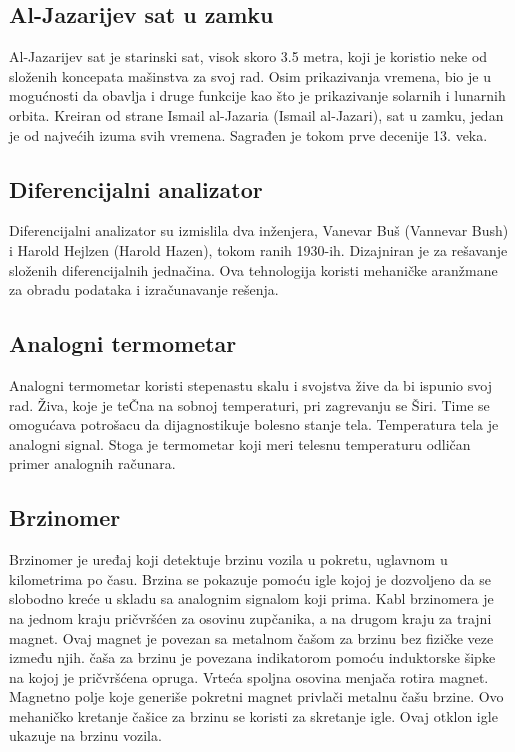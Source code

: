 \documentclass[a4paper]{article}
\begin{document}
{\subsection{Al-Jazarijev sat u zamku}
\label{subsec:podnaslov2}

Al-Jazarijev sat je starinski sat, visok skoro 3.5 metra, koji je koristio neke od složenih koncepata mašinstva za svoj rad. Osim prikazivanja vremena, bio je u mogućnosti da obavlja i druge funkcije kao što je prikazivanje solarnih i lunarnih orbita. Kreiran od strane Ismail al-Jazaria (Ismail al-Jazari), sat u zamku, jedan je od najvećih izuma svih vremena. Sagrađen je tokom prve decenije 13. veka. 

\subsection{Diferencijalni analizator}
\label{subsec:podnaslov3}

 Diferencijalni analizator su izmislila dva inženjera, Vanevar Buš (Vannevar Bush) i Harold Hejlzen (Harold Hazen), tokom ranih 1930-ih. Dizajniran je za rešavanje složenih diferencijalnih jednačina. Ova tehnologija koristi mehaničke aranžmane za obradu podataka i izračunavanje rešenja.

\subsection{Analogni termometar}
\label{subsec:podnaslov4}

Analogni termometar koristi stepenastu skalu i svojstva žive da bi ispunio svoj rad. Živa, koje je teČna na sobnoj temperaturi, pri zagrevanju se Širi. Time se omogućava potrošacu da dijagnostikuje bolesno stanje tela. Temperatura tela je analogni signal. Stoga je termometar koji meri telesnu temperaturu odličan primer analognih računara. 

\subsection{Brzinomer}
\label{subsec:podnaslov5}

Brzinomer je uređaj koji detektuje brzinu vozila u pokretu, uglavnom u kilometrima po času. Brzina se pokazuje pomoću igle kojoj je dozvoljeno da se slobodno kreće u skladu sa analognim signalom koji prima. Kabl brzinomera je na jednom kraju pričvršćen za osovinu zupčanika, a na drugom kraju za trajni magnet. Ovaj magnet je povezan sa metalnom čašom za brzinu bez fizičke veze između njih. čaša za brzinu je povezana indikatorom pomoću induktorske šipke na kojoj je pričvršćena opruga. Vrteća spoljna osovina menjača rotira magnet. Magnetno polje koje generiše pokretni magnet privlači metalnu čašu brzine. Ovo mehaničko kretanje čašice za brzinu se koristi za skretanje igle. Ovaj otklon igle ukazuje na brzinu vozila.


}
\end{document}
